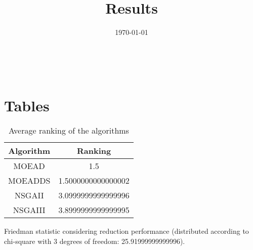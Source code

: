 \documentclass{article}
\title{Results}
\author{}
\date{\today}
\begin{document}
\oddsidemargin 0in \topmargin 0in\maketitle
\
\section{Tables}
\begin{table}[!htp]
\centering
\caption{Average ranking of the algorithms}
\begin{tabular}{c|c}
Algorithm&Ranking\\
\hline
MOEAD&1.5\\
MOEADDS&1.5000000000000002\\
NSGAII&3.0999999999999996\\
NSGAIII&3.8999999999999995\\
\end{tabular}
\end{table}


Friedman statistic considering reduction performance (distributed according to chi-square with 3 degrees of freedom: 25.91999999999996).
\end{document}
